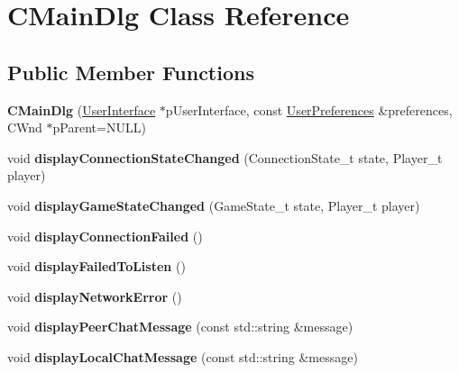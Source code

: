 \hypertarget{classCMainDlg}{
\section{CMainDlg Class Reference}
\label{classCMainDlg}
}
\subsection*{Public Member Functions}
\begin{DoxyCompactItemize}
\item 
\hypertarget{classCMainDlg_a3d1855c88836a3f933555d4ef350412b}{
{\bfseries CMainDlg} (\hyperlink{classUserInterface}{UserInterface} $\ast$pUserInterface, const \hyperlink{structUserPreferences}{UserPreferences} \&preferences, CWnd $\ast$pParent=NULL)}
\label{classCMainDlg_a3d1855c88836a3f933555d4ef350412b}

\item 
\hypertarget{classCMainDlg_a4f3d053547e8dd3ee376747a5899c80f}{
void {\bfseries displayConnectionStateChanged} (ConnectionState\_\-t state, Player\_\-t player)}
\label{classCMainDlg_a4f3d053547e8dd3ee376747a5899c80f}

\item 
\hypertarget{classCMainDlg_af52a54b8267d1aed20a8a7cf68af0eca}{
void {\bfseries displayGameStateChanged} (GameState\_\-t state, Player\_\-t player)}
\label{classCMainDlg_af52a54b8267d1aed20a8a7cf68af0eca}

\item 
\hypertarget{classCMainDlg_a0ed46cba2e44554234ee991f8c3ece30}{
void {\bfseries displayConnectionFailed} ()}
\label{classCMainDlg_a0ed46cba2e44554234ee991f8c3ece30}

\item 
\hypertarget{classCMainDlg_a8d6808eaab0ee11cde45362ffadef5ec}{
void {\bfseries displayFailedToListen} ()}
\label{classCMainDlg_a8d6808eaab0ee11cde45362ffadef5ec}

\item 
\hypertarget{classCMainDlg_ae514375b2047fef42542152203a69391}{
void {\bfseries displayNetworkError} ()}
\label{classCMainDlg_ae514375b2047fef42542152203a69391}

\item 
\hypertarget{classCMainDlg_a2afd2d4afae59cd06054e69f97fb3279}{
void {\bfseries displayPeerChatMessage} (const std::string \&message)}
\label{classCMainDlg_a2afd2d4afae59cd06054e69f97fb3279}

\item 
\hypertarget{classCMainDlg_a345af8a0634e8d49c342b51c5ccc9917}{
void {\bfseries displayLocalChatMessage} (const std::string \&message)}
\label{classCMainDlg_a345af8a0634e8d49c342b51c5ccc9917}


\end{DoxyCompactItemize}

